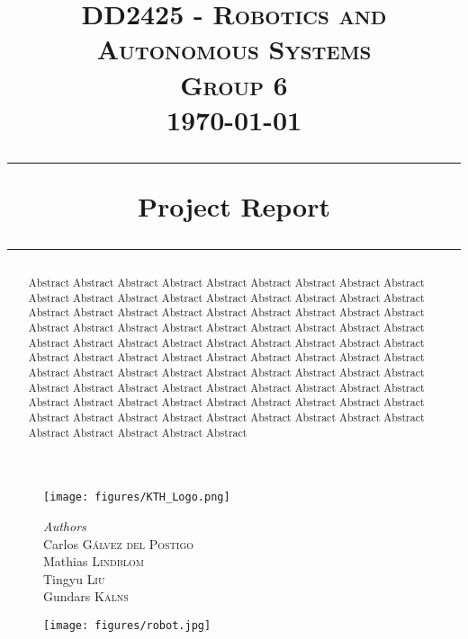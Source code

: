 \begin{titlepage}
\date{}
\begin{figure}
\centering
\texttt{[image: figures/KTH\_Logo.png]}
\end{figure}
\title{
\vspace{-1cm}
\textsc{DD2425 - Robotics and Autonomous Systems}
\\
\vspace{0.5cm}
\textsc{Group 6}\\
{\large \today}
\begin{center}
\rule{\linewidth}{0.5mm}
\textbf{Project Report}
\rule{\linewidth}{0.5mm}
\end{center}
}
\maketitle
\vspace{-2cm}
\begin{figure}[h]
\centering
\begin{minipage}[b]{0.3\linewidth}
                \begin{flushleft}
\normalsize{
\emph{Authors}\\
\vspace{0.5cm}
Carlos \textsc{Gálvez del Postigo} \\
Mathias \textsc{Lindblom} \\
Tingyu \textsc{Liu} \\
Gundars \textsc{Kalns}
}
\end{flushleft}
\end{minipage}
\qquad
\quad
\begin{minipage}[b]{0.62\linewidth}
                \texttt{[image: figures/robot.jpg]}
\end{minipage}
\end{figure}
\vspace{1cm}
\thispagestyle{empty}
\begin{abstract}
Abstract Abstract Abstract Abstract Abstract Abstract Abstract Abstract Abstract Abstract Abstract Abstract Abstract Abstract Abstract Abstract Abstract Abstract Abstract Abstract Abstract Abstract Abstract Abstract Abstract  Abstract Abstract Abstract Abstract Abstract Abstract Abstract Abstract Abstract Abstract Abstract Abstract Abstract Abstract Abstract Abstract Abstract Abstract Abstract Abstract Abstract Abstract Abstract Abstract Abstract Abstract Abstract Abstract Abstract Abstract Abstract Abstract Abstract Abstract Abstract Abstract Abstract Abstract Abstract Abstract Abstract Abstract Abstract Abstract Abstract Abstract Abstract Abstract Abstract Abstract Abstract Abstract Abstract Abstract Abstract Abstract Abstract Abstract Abstract Abstract Abstract Abstract Abstract Abstract Abstract Abstract Abstract Abstract Abstract Abstract 
\end{abstract}
\end{titlepage}